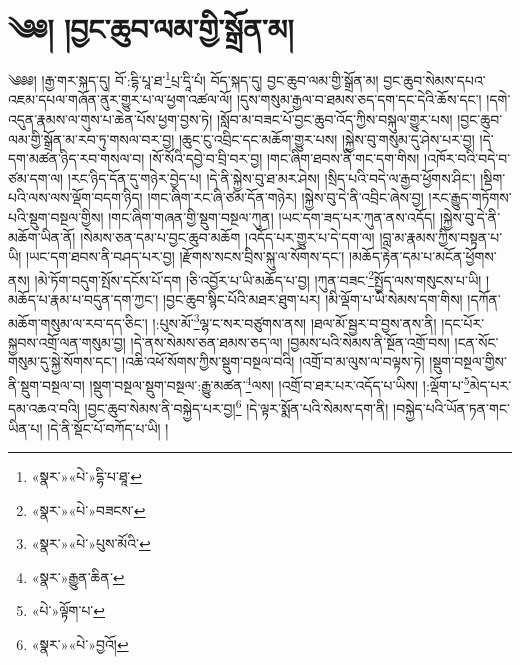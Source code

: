 \chapter{༄༅། །བྱང་ཆུབ་ལམ་གྱི་སྒྲོན་མ།}༄༅༅། །རྒྱ་གར་སྐད་དུ། བོ་:དྷི་པཱ་ཐ་\footnote{«སྣར་»«པེ་»དྷི་པ་ཐཱ་}པྲ་དཱི་པཾ། བོད་སྐད་དུ། བྱང་ཆུབ་ལམ་གྱི་སྒྲོན་མ། བྱང་ཆུབ་སེམས་དཔའ་འཇམ་དཔལ་གཞོན་ནུར་གྱུར་པ་ལ་ཕྱག་འཚལ་ལོ། །དུས་གསུམ་རྒྱལ་བ་ཐམས་ཅད་དག་དང་དེའི་ཆོས་དང་། །དགེ་འདུན་རྣམས་ལ་གུས་པ་ཆེན་པོས་ཕྱག་བྱས་ཏེ། །སློབ་མ་བཟང་པོ་བྱང་ཆུབ་འོད་ཀྱིས་བསྐུལ་གྱུར་པས། །བྱང་ཆུབ་ལམ་གྱི་སྒྲོན་མ་རབ་ཏུ་གསལ་བར་བྱ། །ཆུང་ངུ་འབྲིང་དང་མཆོག་གྱུར་པས། །སྐྱེས་བུ་གསུམ་དུ་ཤེས་པར་བྱ། །དེ་དག་མཚན་ཉིད་རབ་གསལ་བ། །སོ་སོའི་དབྱེ་བ་བྲི་བར་བྱ། །གང་ཞིག་ཐབས་ནི་གང་དག་གིས། །འཁོར་བའི་བདེ་བ་ཙམ་དག་ལ། །རང་ཉིད་དོན་དུ་གཉེར་བྱེད་པ། །དེ་ནི་སྐྱེས་བུ་ཐ་མར་ཤེས། །སྲིད་པའི་བདེ་ལ་རྒྱབ་ཕྱོགས་ཤིང་། །སྡིག་པའི་ལས་ལས་ལྡོག་བདག་ཉིད། །གང་ཞིག་རང་ཞི་ཙམ་དོན་གཉེར། །སྐྱེས་བུ་དེ་ནི་འབྲིང་ཞེས་བྱ། །རང་རྒྱུད་གཏོགས་པའི་སྡུག་བསྔལ་གྱིས། །གང་ཞིག་གཞན་གྱི་སྡུག་བསྔལ་ཀུན། །ཡང་དག་ཟད་པར་ཀུན་ནས་འདོད། །སྐྱེས་བུ་དེ་ནི་མཆོག་ཡིན་ནོ། །སེམས་ཅན་དམ་པ་བྱང་ཆུབ་མཆོག །འདོད་པར་གྱུར་པ་དེ་དག་ལ། །བླ་མ་རྣམས་ཀྱིས་བསྟན་པ་ཡི། །ཡང་དག་ཐབས་ནི་བཤད་པར་བྱ། །རྫོགས་སངས་བྲིས་སྐུ་ལ་སོགས་དང་། །མཆོད་རྟེན་དམ་པ་མངོན་ཕྱོགས་ནས། །མེ་ཏོག་བདུག་སྤོས་དངོས་པོ་དག །ཅི་འབྱོར་པ་ཡི་མཆོད་པ་བྱ། །ཀུན་བཟང་\footnote{«སྣར་»«པེ་»བཟངས་}སྤྱོད་ལས་གསུངས་པ་ཡི། །མཆོད་པ་རྣམ་པ་བདུན་དག་ཀྱང་། །བྱང་ཆུབ་སྙིང་པོའི་མཐར་ཐུག་པར། །མི་ལྡོག་པ་ཡི་སེམས་དག་གིས། །དཀོན་མཆོག་གསུམ་ལ་རབ་དད་ཅིང་། །:པུས་མོ་\footnote{«སྣར་»«པེ་»པུས་མོའི་}ལྷ་ང་སར་བཙུགས་ནས། །ཐལ་མོ་སྦྱར་བ་བྱས་ནས་ནི། །དང་པོར་སྐྱབས་འགྲོ་ལན་གསུམ་བྱ། །དེ་ནས་སེམས་ཅན་ཐམས་ཅད་ལ། །བྱམས་པའི་སེམས་ནི་སྔོན་འགྲོ་བས། །ངན་སོང་གསུམ་དུ་སྐྱེ་སོགས་དང་། །འཆི་འཕོ་སོགས་ཀྱིས་སྡུག་བསྔལ་བའི། །འགྲོ་བ་མ་ལུས་ལ་བལྟས་ཏེ། །སྡུག་བསྔལ་གྱིས་ནི་སྡུག་བསྔལ་བ། །སྡུག་བསྔལ་སྡུག་བསྔལ་:རྒྱུ་མཚན་\footnote{«སྣར་»རྒྱུན་ཆིན་}ལས། །འགྲོ་བ་ཐར་པར་འདོད་པ་ཡིས། །:ལྡོག་པ་\footnote{«པེ་»ལྟོག་པ་}མེད་པར་དམ་འཆའ་བའི། །བྱང་ཆུབ་སེམས་ནི་བསྐྱེད་པར་བྱ།\footnote{«སྣར་»«པེ་»བྱའོ།} །དེ་ལྟར་སྨོན་པའི་སེམས་དག་ནི། །བསྐྱེད་པའི་ཡོན་ཏན་གང་ཡིན་པ། །དེ་ནི་སྡོང་པོ་བཀོད་པ་ཡི། །
